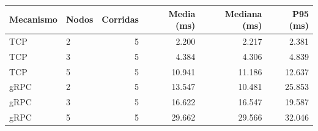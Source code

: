 \begin{tabular}{llrrrr}
\toprule
Mecanismo & Nodos & Corridas & Media (ms) & Mediana (ms) & P95 (ms) \\
\midrule
TCP & 2 & 5 & 2.200 & 2.217 & 2.381 \\
TCP & 3 & 5 & 4.384 & 4.306 & 4.839 \\
TCP & 5 & 5 & 10.941 & 11.186 & 12.637 \\
gRPC & 2 & 5 & 13.547 & 10.481 & 25.853 \\
gRPC & 3 & 5 & 16.622 & 16.547 & 19.587 \\
gRPC & 5 & 5 & 29.662 & 29.566 & 32.046 \\
\bottomrule
\end{tabular}

